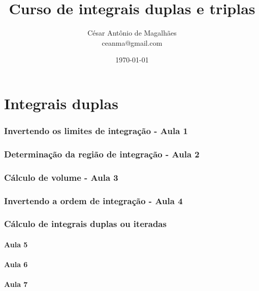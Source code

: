 \documentclass[12pt, a4paper]{article}
\title{Curso de integrais duplas e triplas}
\author{César Antônio de Magalhães \\ ceanma@gmail.com}
\date{\today}
\begin{document}
	\maketitle\newpage
	
	\tableofcontents\newpage
	
	
	\listoffigures\newpage
	
	
	\part{Integrais duplas}	
		\section{Invertendo os limites de integração - Aula 1}			
					
		\section{Determinação da região de integração - Aula 2}		
					
		\section{Cálculo de volume - Aula 3}
					
		\section{Invertendo a ordem de integração - Aula 4}
					
		\section{Cálculo de integrais duplas ou iteradas}
			\subsection{Aula 5}
						
			\subsection{Aula 6}
						
			\subsection{Aula 7}
				
		
\end{document}
